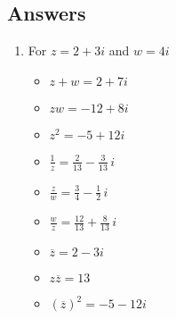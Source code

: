 \newpage

\subsection{Answers}

\begin{enumerate}

\item  For $z = 2+3i$ and $w = 4i$

\begin{multicols}{3}

\begin{itemize}

\item $z+w = 2+7i$

\item $zw = -12+8i$

\item $z^2 = -5 + 12i$

\end{itemize}

\end{multicols}

\begin{multicols}{3}

\begin{itemize}

\item $\frac{1}{z} = \frac{2}{13} - \frac{3}{13} \, i$

\item $\frac{z}{w} = \frac{3}{4} - \frac{1}{2} \, i$

\item $\frac{w}{z} = \frac{12}{13} + \frac{8}{13} \,i$

\end{itemize}

\end{multicols}

\begin{multicols}{3}

\begin{itemize}

\item $\overline{z} = 2-3i$

\item $z\overline{z} = 13$

\item $(\overline{z})^2 = -5-12i$

\end{itemize}


\end{multicols}
\end{enumerate}
